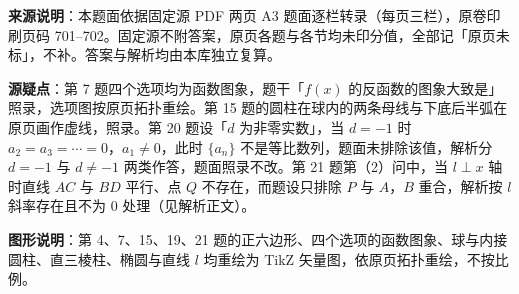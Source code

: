 


\begin{gktip}
\textbf{来源说明}：本题面依据固定源 PDF 两页 A3 题面逐栏转录（每页三栏），原卷印刷页码 701–702。固定源不附答案，原页各题与各节均未印分值，全部记「原页未标」，不补。答案与解析均由本库独立复算。

\textbf{源疑点}：第 7 题四个选项均为函数图象，题干「$f(x)$ 的反函数的图象大致是」照录，选项图按原页拓扑重绘。第 15 题的圆柱在球内的两条母线与下底后半弧在原页画作虚线，照录。第 20 题设「$d$ 为非零实数」，当 $d=-1$ 时 $a_2=a_3=\cdots=0$，$a_1\neq0$，此时 $\{a_n\}$ 不是等比数列，题面未排除该值，解析分 $d=-1$ 与 $d\neq-1$ 两类作答，题面照录不改。第 21 题第（2）问中，当 $l\perp x$ 轴时直线 $AC$ 与 $BD$ 平行、点 $Q$ 不存在，而题设只排除 $P$ 与 $A$，$B$ 重合，解析按 $l$ 斜率存在且不为 $0$ 处理（见解析正文）。

\textbf{图形说明}：第 4、7、15、19、21 题的正六边形、四个选项的函数图象、球与内接圆柱、直三棱柱、椭圆与直线 $l$ 均重绘为 TikZ 矢量图，依原页拓扑重绘，不按比例。
\end{gktip}


